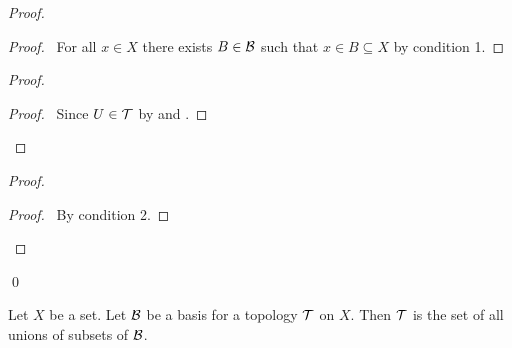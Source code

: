 \begin{proof}
    \pf
    \begin{proof}
        \pf\ For all $x \in X$ there exists $B \in \mathcal{B}$ such that $x \in B \subseteq X$ by condition 1.
    \end{proof}
    \begin{proof}
        \begin{proof}
            \pf\ Since $U \in \mathcal{T}$ by  and .
        \end{proof}
    \end{proof}
    \begin{proof}
        \begin{proof}
            \pf\ By condition 2.
        \end{proof}
    \end{proof}
    \qed
\end{proof}

\begin{lemma}
    \label{lemma:basis_unions}
    Let $X$ be a set. Let $\mathcal{B}$ be a basis for a topology $\mathcal{T}$ on $X$. Then $\mathcal{T}$ is the set of all unions of 
    subsets of $\mathcal{B}$.
\end{lemma}

